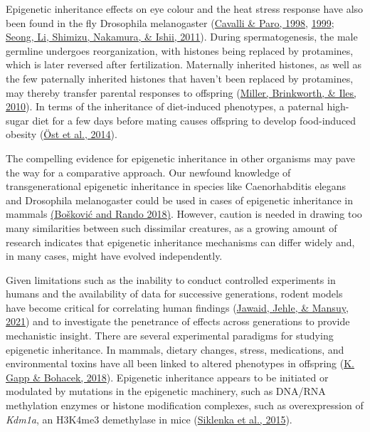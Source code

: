 \documentclass[12pt,twoside]{reedthesis}
\begin{document}
Epigenetic inheritance effects on eye colour and the heat stress
response have also been found in the fly Drosophila melanogaster
(\protect\hyperlink{ref-cavalli1998}{Cavalli \& Paro, 1998}, \protect\hyperlink{ref-cavalli1999}{1999}; \protect\hyperlink{ref-seong2011}{Seong, Li, Shimizu, Nakamura, \& Ishii, 2011}). During spermatogenesis, the
male germline undergoes reorganization, with histones being replaced by
protamines, which is later reversed after fertilization. Maternally
inherited histones, as well as the few paternally inherited histones
that haven't been replaced by protamines, may thereby transfer parental
responses to offspring (\protect\hyperlink{ref-miller2010}{Miller, Brinkworth, \& Iles, 2010}). In terms of the inheritance of
diet-induced phenotypes, a paternal high-sugar diet for a few days
before mating causes offspring to develop food-induced obesity
(\protect\hyperlink{ref-uxf6st2014}{Öst et al., 2014}).

The compelling evidence for epigenetic inheritance in other organisms
may pave the way for a comparative approach. Our newfound knowledge of
transgenerational epigenetic inheritance in species like Caenorhabditis
elegans and Drosophila melanogaster could be used in cases of epigenetic
inheritance in mammals \href{https://sciwheel.com/work/citation?ids=5816737\&pre=\&suf=\&sa=0}{(Bošković and Rando
2018)}.
However, caution is needed in drawing too many similarities between such
dissimilar creatures, as a growing amount of research indicates that
epigenetic inheritance mechanisms can differ widely and, in many cases,
might have evolved independently.

Given limitations such as the inability to conduct controlled
experiments in humans and the availability of data for successive
generations, rodent models have become critical for correlating human
findings (\protect\hyperlink{ref-jawaid2021}{Jawaid, Jehle, \& Mansuy, 2021}) and to investigate the penetrance of effects
across generations to provide mechanistic insight. There are several
experimental paradigms for studying epigenetic inheritance. In mammals,
dietary changes, stress, medications, and environmental toxins have all
been linked to altered phenotypes in offspring (\protect\hyperlink{ref-gapp2018}{K. Gapp \& Bohacek, 2018}). Epigenetic
inheritance appears to be initiated or modulated by mutations in the
epigenetic machinery, such as DNA/RNA methylation enzymes or histone
modification complexes, such as overexpression of \emph{Kdm1a}, an H3K4me3
demethylase in mice (\protect\hyperlink{ref-siklenka2015}{Siklenka et al., 2015}).
\end{document}
